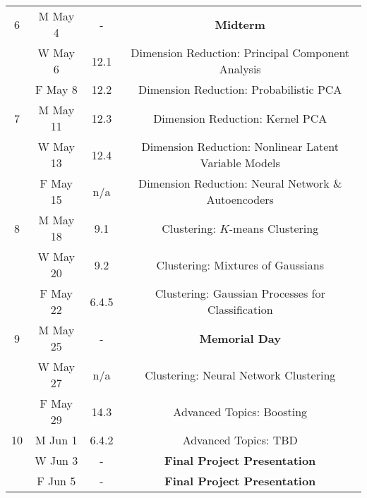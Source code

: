 \documentclass[11pt]{article}
\begin{document}
\begin{tabular*}{\textwidth}{cccc}
\hline

6 & M May 4  &    -    & \textbf{Midterm} \\
  & W May 6  &   12.1  & Dimension Reduction: Principal Component Analysis \\
  & F May 8  &   12.2  & Dimension Reduction: Probabilistic PCA \\ %
 
\hline

7 & M May 11 &   12.3  & Dimension Reduction: Kernel PCA \\
  & W May 13 &   12.4  & Dimension Reduction: Nonlinear Latent Variable Models \\
  & F May 15 &   n/a   & Dimension Reduction: Neural Network \& Autoencoders \\
 
\hline

8 & M May 18 &   9.1   & Clustering: $K$-means Clustering \\  
  & W May 20 &   9.2   & Clustering: Mixtures of Gaussians \\
  & F May 22 &  6.4.5  & Clustering: Gaussian Processes for Classification \\
 
\hline

9 & M May 25 &    -    & \textbf{Memorial Day} \\
  & W May 27 &   n/a   & Clustering: Neural Network Clustering \\
  & F May 29 &   14.3  & Advanced Topics: Boosting \\ %
 
\hline

10& M Jun 1  &  6.4.2  & Advanced Topics: TBD \\ %
  & W Jun 3  &    -    & \textbf{Final Project Presentation} \\
  & F Jun 5  &    -    & \textbf{Final Project Presentation} \\
 
\hline
\end{tabular*}
\end{document}
